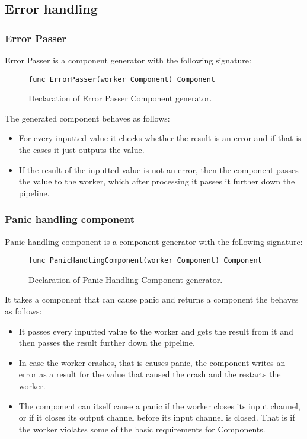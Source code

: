 \documentclass[12pt,a4paper]{article}
\begin{document}
\subsection{Error handling}
\subsubsection{Error Passer}
Error Passer is a component generator with the following signature:

\begin{figure}[h]
\centering
\begin{lstlisting}
func ErrorPasser(worker Component) Component
\end{lstlisting}
\caption[scale=1.0]{Declaration of Error Passer Component generator.}
\label{fig:ErrorPasser}
\end{figure}

The generated component behaves as follows:
\begin{itemize}
	\item For every inputted value it checks whether the result is an error
				and if that is the cases it just outputs the value.
	\item If the result of the inputted value is not an error, then the component
				passes the value to the worker, which after processing it passes 
				it further down the pipeline.
\end{itemize}

\subsubsection{Panic handling component}
Panic handling component is a component generator with the following signature:

\begin{figure}[h]
\centering
\begin{lstlisting}
func PanicHandlingComponent(worker Component) Component
\end{lstlisting}
\caption[scale=1.0]{Declaration of Panic Handling Component generator.}
\label{fig:panicHandler}
\end{figure}

It takes a component that can cause panic and returns a component the behaves as follows:
\begin{itemize}
	\item It passes every inputted value to the worker and gets the result from it and then passes
				the result further down the pipeline.
	\item In case the worker crashes, that is causes panic, the component writes an error as a result 
				for the value that caused the crash and the restarts the worker.
	\item The component can itself cause a panic if the worker closes its input channel, or if 
				it closes its output channel before its input channel is closed. That is if the worker
				violates some of the basic requirements for Components.
\end{itemize}
\end{document}
